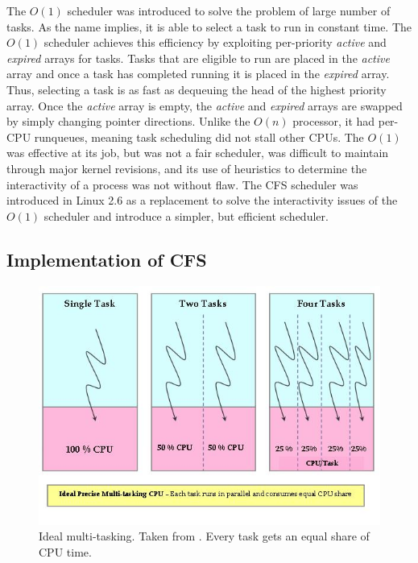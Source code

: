\documentclass{sig-alternate-10pt}
\begin{document}
The $ O(1) $ scheduler was introduced to solve the problem of large number of tasks. As the name implies, it is able to select a task to run in constant time. The $ O(1) $ scheduler achieves this efficiency by exploiting per-priority \textit{active} and \textit{expired} arrays for tasks. Tasks that are eligible to run are placed in the \textit{active} array and once a task has completed running it is placed in the \textit{expired} array. Thus, selecting a task is as fast as dequeuing the head of the highest priority array. Once the \textit{active} array is empty, the \textit{active} and \emph{expired} arrays are swapped by simply changing pointer directions. Unlike the $ O(n) $ processor, it had per-CPU runqueues, meaning task scheduling did not stall other CPUs. The $ O(1) $ was effective at its job, but was not a fair scheduler, was difficult to maintain through major kernel revisions, and its use of heuristics to determine the interactivity of a process was not without flaw. The CFS scheduler was introduced in Linux 2.6 as a replacement to solve the interactivity issues of the $ O(1) $ scheduler and introduce a simpler, but efficient scheduler.

\subsection{Implementation of CFS}

\begin{figure}
	\begin{center}
		\includegraphics[width=0.9\linewidth]{fig/mutlitasking.jpg}
		\caption{
			Ideal multi-tasking. Taken from \protect\cite{fig:multitask}. Every task gets an equal share of CPU time.
		}
		\label{fig:cfs_multitask}
	\end{center}
\end{figure}
\end{document}
